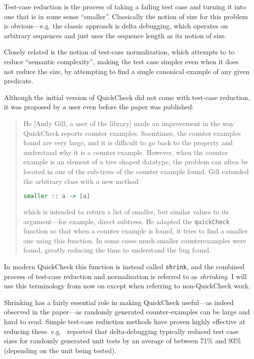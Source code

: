 Test-case reduction is the process of taking a failing test case and turning it into one that is in some sense ``smaller''.
Classically the notion of size for this problem is obvious---e.g.
the classic approach is delta debugging\cite{DBLP:journals/tse/ZellerH02},
which operates on arbitrary sequences and just uses the sequence length as its notion of size.

Closely related is the notion of test-case normalization\cite{DBLP:conf/issta/GroceHK17},
which attempts to to reduce ``semantic complexity'',
making the test case simpler even when it does not reduce the size,
by attempting to find a single canonical example of any given predicate.

Although the initial version of QuickCheck did not come with test-case reduction,
it was proposed by a user even before the paper was published:

\begin{quote}
He [Andy Gill, a user of the library] made an improvement in the way QuickCheck reports counter examples.
Soemtimes, the counter examples found are very large,
and it is difficult to go back to the property and understand why it is a counter example.
However,
when the counter example is an element of a tree shaped datatype,
the problem can often be located in one of the sub-trees of the counter example found.
Gill extended the arbitrary class with a new method

\begin{lstlisting}[language=Haskell]
smaller :: a -> [a]
\end{lstlisting}

which is intended to return a list of smaller, but similar values to its argument---for example, direct subtrees.
He adapted the \texttt{quickCheck} function so that when a counter example is found,
it tries to find a smaller one using this function.
In some cases much smaller counterexamples were found,
greatly reducing the time to understand the bug found.
\end{quote}

In modern QuickCheck this function is instead called \texttt{shrink},
and the combined process of test-case reduction and normalization is referred to as \emph{shrinking}.
I will use this terminology from now on except when referring to non-QuickCheck work.

Shrinking has a fairly essential role in making QuickCheck useful---as indeed observed in the paper---as randomly generated counter-examples can be large and hard to read.
Simple test-case reduction methods have proven highly effective at reducing these.
e.g.~ \cite{DBLP:conf/issre/LeiA05} reported that delta-debugging typically reduced test case sizes for randomly generated unit tests by an average of between 71\% and 93\% (depending on the unit being tested). 

